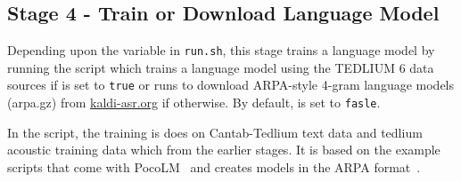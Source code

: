 \subsection{Stage 4 - Train or Download Language Model}
Depending upon the  variable in \texttt{run.sh}, this stage trains a language model by running the  script which trains a language model using the TEDLIUM 6 data sources if  is set to \texttt{true} or runs  to download ARPA-style 4-gram language models (arpa.gz) from \url{kaldi-asr.org} if otherwise. By default,  is set to \texttt{fasle}.

In the  script, the training is does on Cantab-Tedlium text data and tedlium acoustic training data which from the earlier stages.
It is based on the example scripts that come with PocoLM~\cite{pocolm} and creates models in the ARPA format~\cite{arpaformat}.




